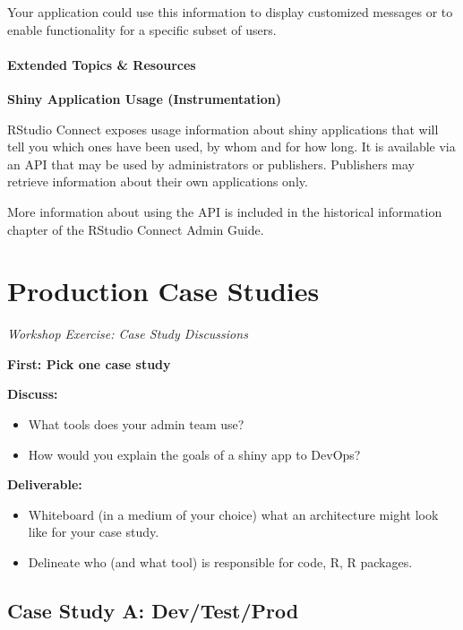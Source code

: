 \documentclass[]{book}
\providecommand{\tightlist}{%
  \setlength{\itemsep}{0pt}\setlength{\parskip}{0pt}}
\theoremstyle{definition}
\theoremstyle{definition}
\theoremstyle{definition}
\theoremstyle{remark}
\begin{document}
Your application could use this information to display customized
messages or to enable functionality for a specific subset of users.

\hypertarget{extended-topics-resources}{%
\subsubsection{Extended Topics \&
Resources}\label{extended-topics-resources}}

\textbf{Shiny Application Usage (Instrumentation)}

RStudio Connect exposes usage information about shiny applications that
will tell you which ones have been used, by whom and for how long. It is
available via an API that may be used by administrators or publishers.
Publishers may retrieve information about their own applications only.

More information about using the API is included in the historical
information chapter of the RStudio Connect Admin Guide.

\hypertarget{production-case-studies}{%
\chapter{Production Case Studies}\label{production-case-studies}}

\emph{Workshop Exercise: Case Study Discussions}

\textbf{First: Pick one case study}

\textbf{Discuss:}

\begin{itemize}
\tightlist
\item
  What tools does your admin team use?
\item
  How would you explain the goals of a shiny app to DevOps?
\end{itemize}

\textbf{Deliverable:}

\begin{itemize}
\tightlist
\item
  Whiteboard (in a medium of your choice) what an architecture might
  look like for your case study.
\item
  Delineate who (and what tool) is responsible for code, R, R packages.
\end{itemize}

\hypertarget{case-study-a-devtestprod}{%
\section{Case Study A: Dev/Test/Prod}\label{case-study-a-devtestprod}}
\end{document}
